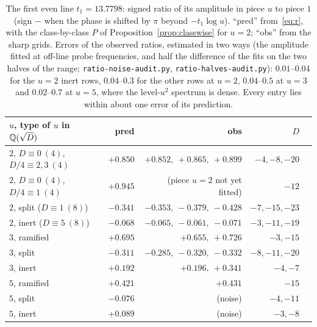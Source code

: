 \documentclass[11pt,a4paper]{article}
\theoremstyle{remark}\newtheorem{remark}[theorem]{Remark}
\begin{document}
\begin{table}[htbp]\centering\small
\caption{The first even line $t_1=13.7798$: signed ratio of its amplitude in piece $u$ to piece $1$ (sign $-$ when the
phase is shifted by $\pi$ beyond $-t_1\log u$). ``pred'' from~\eqref{eq:r}, with the class-by-class $P$ of
Proposition~\ref{prop:classwise} for $u=2$; ``obs'' from the sharp grids. Errors of the observed ratios, estimated in two ways (the amplitude fitted at off-line probe
frequencies, and half the difference of the fits on the two halves of the range; \texttt{ratio-noise-audit.py},
\texttt{ratio-halves-audit.py}): $0.01$--$0.04$ for the $u=2$ inert rows, $0.04$--$0.3$ for the other rows at $u=2$, $0.04$--$0.5$ at
$u=3$ and $0.02$--$0.7$ at $u=5$, where the level-$u^2$ spectrum is dense. Every entry lies within about one error of its prediction.}\label{tab:ratios}
\begin{tabular}{@{}lrrrl@{}}
\toprule
$u$, type of $u$ in $\mathbb Q(\sqrt D)$ & pred & obs & $D$\\
\midrule
$2$, $D\equiv0\ (4)$, $D/4\equiv2,3\ (4)$ & $+0.850$ & $+0.852,\ +0.865,\ +0.899$ & $-4,-8,-20$\\
$2$, $D\equiv0\ (4)$, $D/4\equiv1\ (4)$ & $+0.945$ & (piece $u=2$ not yet fitted) & $-12$\\
$2$, split ($D\equiv1\ (8)$) & $-0.341$ & $-0.353,\ -0.379,\ -0.428$ & $-7,-15,-23$\\
$2$, inert ($D\equiv5\ (8)$) & $-0.068$ & $-0.065,\ -0.061,\ -0.071$ & $-3,-11,-19$\\
$3$, ramified & $+0.695$ & $+0.655,\ +0.726$ & $-3,-15$\\
$3$, split & $-0.311$ & $-0.285,\ -0.320,\ -0.332$ & $-8,-11,-20$\\
$3$, inert & $+0.192$ & $+0.196,\ +0.341$ & $-4,-7$\\
$5$, ramified & $+0.421$ & $+0.431$ & $-15$\\
$5$, split & $-0.076$ & (noise) & $-4,-11$\\
$5$, inert & $+0.089$ & (noise) & $-3,-8$\\
\bottomrule
\end{tabular}
\end{table}
\end{document}
